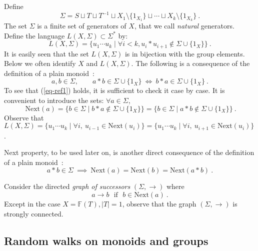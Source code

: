 \documentclass[11pt,a4paper]{article}
\theoremstyle{remark}
\def\Blackboardfont{\mathbb}
\def\rig{\text{Next}}
\def\lef{\text{Next}}
\def\F{{\Blackboardfont F}}
\def\iff{\Longleftrightarrow}
\def\eref#1{(\ref{#1})}
\begin{document}
Define
\begin{equation}\label{eq-sigma}
\Sigma = S \sqcup T \sqcup T^{-1} \sqcup X_1\setminus\{1_{X_1}\}
\sqcup \cdots \sqcup X_k\setminus\{1_{X_k}\}\:.
\end{equation}
The set $\Sigma$ is a finite set of generators of $X$, that we
call {\em natural} generators. Define the language $L(X,\Sigma) \subset \Sigma^{*}$ by:
\begin{equation}\label{eq-loca}
L(X,\Sigma) = \bigl\{u_{1}\cdots u_{k} \mid \forall i< k, u_{i}
\ast u_{i+1} \notin \Sigma \cup \{1_{X}\} \bigr\}\:.
\end{equation}
It is easily seen that the set $L(X,\Sigma)$ is in bijection with the
group elements. Below we often identify $X$ and $L(X,\Sigma)$. 
The following is a consequence of the definition of a plain monoid~: 
\begin{equation}\label{eq-ref1}
a,b\in \Sigma, \qquad a\ast b \in \Sigma \cup \{1_X\} \ \iff \  b\ast a \in
\Sigma \cup \{1_X\} \:.
\end{equation}
To see that \eref{eq-ref1} holds, it is sufficient to check it case by
case. 
It is convenient to introduce the sets: $\forall a \in
\Sigma$,
\begin{equation}\label{eq-next}
\ \rig(a) = \{ b \in \Sigma \mid b \ast a \notin \Sigma \cup
\{1_{X}\}\} \nonumber= \{ b \in \Sigma \mid a \ast b \notin \Sigma
\cup \{1_{X}\}\}\:.
\end{equation}
Observe that $L(X,\Sigma) =  \bigl\{u_{1}\cdots u_{k} \mid \forall
i, \  u_{i-1} \in \lef( u_{i}) \bigr\} = \bigl\{u_{1}\cdots u_{k}
\mid \forall i, \  u_{i+1} \in \rig( u_{i}) \bigr\}$.

Next property, to be used later on, is another direct consequence of
the definition of a plain monoid~:
\begin{equation}\label{eq-ref2}
a\ast b \in \Sigma \ \implies \ \rig(a) = \rig(b) = \rig(a*b)\:.
\end{equation}

\medskip

Consider the directed {\em graph of successors} $(\Sigma,\rightarrow)$ where 
\begin{equation}\label{eq-graph}
a\rightarrow b \ \ \ \text{if} \ \ \ b\in \rig(a) \:.
\end{equation}
Except in the case $X=\F(T), |T|=1$, observe that the graph $(\Sigma,\rightarrow)$ is strongly
connected. 





\subsection{Random walks on monoids and groups}
\end{document}
